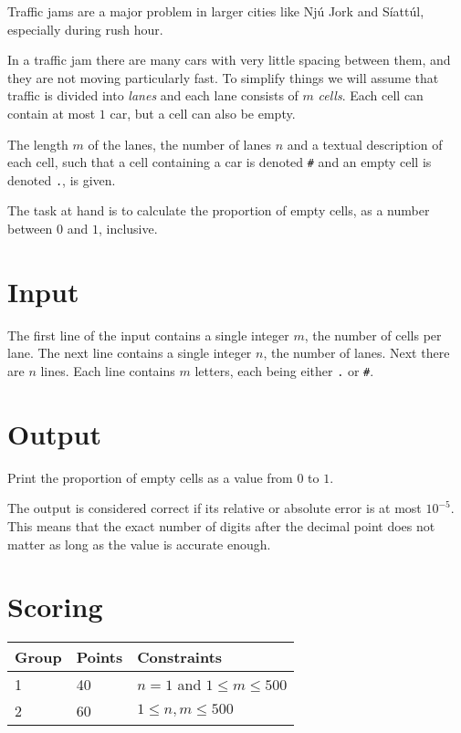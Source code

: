 
Traffic jams are a major problem in larger cities like Njú Jork and Síattúl, especially during rush hour.

In a traffic jam there are many cars with very little spacing between them, and they are not moving particularly fast.
To simplify things we will assume that traffic is divided into \emph{lanes} and each lane consists of $m$ \emph{cells}.
Each cell can contain at most $1$ car, but a cell can also be empty.

The length $m$ of the lanes, the number of lanes $n$ and a textual description of each cell, such that a cell
containing a car is denoted \texttt{\#} and an empty cell is denoted \texttt{.}, is given.

The task at hand is to calculate the proportion of empty cells, as a number between $0$ and $1$, inclusive.

\section*{Input}
The first line of the input contains a single integer $m$, the number of cells per lane.
The next line contains a single integer $n$, the number of lanes.
Next there are $n$ lines.
Each line contains $m$ letters, each being either \texttt{.} or \texttt{\#}.

\section*{Output}
Print the proportion of empty cells as a value from $0$ to $1$.

The output is considered correct if its relative or absolute error is at most $10^{-5}$. This means that the exact number of digits after the
decimal point does not matter as long as the value is accurate enough.

\section*{Scoring}
\begin{tabular}{|l|l|l|}
\hline
Group & Points & Constraints \\ \hline
1     & 40   & $n = 1$ and $ 1 \leq m \leq 500$ \\ \hline
2     & 60   & $1 \leq n, m \leq 500$ \\ \hline
\end{tabular}

